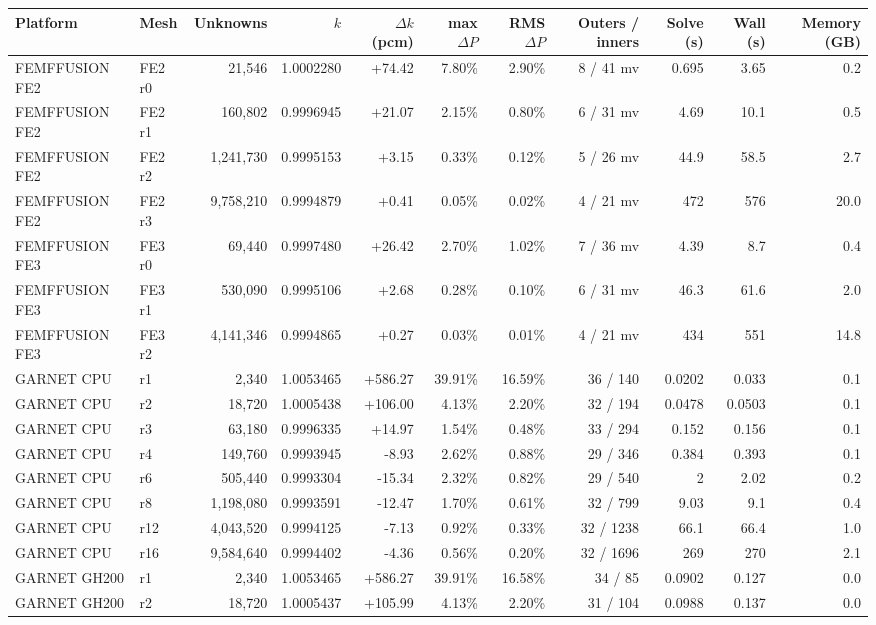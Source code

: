 \begin{tabular}{llrrrrrrrrr}
\hline
Platform & Mesh & Unknowns & $k$ & $\Delta k$ (pcm) & max $\Delta P$ & RMS $\Delta P$ & Outers / inners & Solve (s) & Wall (s) & Memory (GB) \\
\hline
FEMFFUSION FE2 & FE2 r0 & 21,546 & 1.0002280 & +74.42 & 7.80\% & 2.90\% & 8 / 41 mv & 0.695 & 3.65 & 0.2 \\
FEMFFUSION FE2 & FE2 r1 & 160,802 & 0.9996945 & +21.07 & 2.15\% & 0.80\% & 6 / 31 mv & 4.69 & 10.1 & 0.5 \\
FEMFFUSION FE2 & FE2 r2 & 1,241,730 & 0.9995153 & +3.15 & 0.33\% & 0.12\% & 5 / 26 mv & 44.9 & 58.5 & 2.7 \\
FEMFFUSION FE2 & FE2 r3 & 9,758,210 & 0.9994879 & +0.41 & 0.05\% & 0.02\% & 4 / 21 mv & 472 & 576 & 20.0 \\
FEMFFUSION FE3 & FE3 r0 & 69,440 & 0.9997480 & +26.42 & 2.70\% & 1.02\% & 7 / 36 mv & 4.39 & 8.7 & 0.4 \\
FEMFFUSION FE3 & FE3 r1 & 530,090 & 0.9995106 & +2.68 & 0.28\% & 0.10\% & 6 / 31 mv & 46.3 & 61.6 & 2.0 \\
FEMFFUSION FE3 & FE3 r2 & 4,141,346 & 0.9994865 & +0.27 & 0.03\% & 0.01\% & 4 / 21 mv & 434 & 551 & 14.8 \\
GARNET CPU & r1 & 2,340 & 1.0053465 & +586.27 & 39.91\% & 16.59\% & 36 / 140 & 0.0202 & 0.033 & 0.1 \\
GARNET CPU & r2 & 18,720 & 1.0005438 & +106.00 & 4.13\% & 2.20\% & 32 / 194 & 0.0478 & 0.0503 & 0.1 \\
GARNET CPU & r3 & 63,180 & 0.9996335 & +14.97 & 1.54\% & 0.48\% & 33 / 294 & 0.152 & 0.156 & 0.1 \\
GARNET CPU & r4 & 149,760 & 0.9993945 & -8.93 & 2.62\% & 0.88\% & 29 / 346 & 0.384 & 0.393 & 0.1 \\
GARNET CPU & r6 & 505,440 & 0.9993304 & -15.34 & 2.32\% & 0.82\% & 29 / 540 & 2 & 2.02 & 0.2 \\
GARNET CPU & r8 & 1,198,080 & 0.9993591 & -12.47 & 1.70\% & 0.61\% & 32 / 799 & 9.03 & 9.1 & 0.4 \\
GARNET CPU & r12 & 4,043,520 & 0.9994125 & -7.13 & 0.92\% & 0.33\% & 32 / 1238 & 66.1 & 66.4 & 1.0 \\
GARNET CPU & r16 & 9,584,640 & 0.9994402 & -4.36 & 0.56\% & 0.20\% & 32 / 1696 & 269 & 270 & 2.1 \\
GARNET GH200 & r1 & 2,340 & 1.0053465 & +586.27 & 39.91\% & 16.58\% & 34 / 85 & 0.0902 & 0.127 & 0.0 \\
GARNET GH200 & r2 & 18,720 & 1.0005437 & +105.99 & 4.13\% & 2.20\% & 31 / 104 & 0.0988 & 0.137 & 0.0 \\

\end{tabular}
